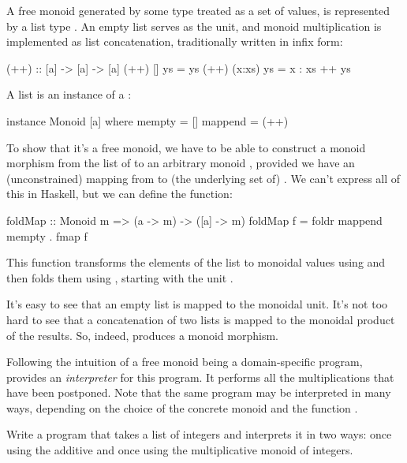 \documentclass[DaoFP]{subfiles}
\begin{document}
A free monoid generated by some type  treated as a set of values, is represented by a list type \hask{[a]}. An empty list serves as the unit, and monoid multiplication is implemented as list concatenation, traditionally written in infix form:
\begin{haskell}
(++) :: [a] -> [a] -> [a]
(++) []     ys = ys
(++) (x:xs) ys = x : xs ++ ys
\end{haskell}
A list is an instance of a :
\begin{haskell}
instance Monoid [a] where
  mempty = []
  mappend = (++)
\end{haskell}

To show that it's a free monoid, we have to be able to construct a monoid morphism from the list of  to an arbitrary monoid , provided we have an (unconstrained) mapping from  to (the underlying set of) . We can't express all of this in Haskell, but we can define the function:
\begin{haskell}
foldMap :: Monoid m => (a -> m) -> ([a] -> m)
foldMap f = foldr mappend mempty . fmap f
\end{haskell}
This function transforms the elements of the list to monoidal values using  and then folds them using , starting with the unit . 

It's easy to see that an empty list is mapped to the monoidal unit. It's not too hard to see that a concatenation of two lists is mapped to the monoidal product of the results. So, indeed,  produces a monoid morphism. 

Following the intuition of a free monoid being a domain-specific program,  provides an \emph{interpreter} for this program. It performs all the multiplications that have been postponed. Note that the same program may be interpreted in many ways, depending on the choice of the concrete monoid and the function .

\begin{exercise}
Write a program that takes a list of integers and interprets it in two ways: once using the additive and once using the multiplicative monoid of integers.
\end{exercise}
\end{document}

